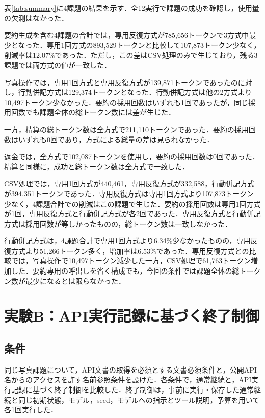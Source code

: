 \documentclass[letter]{ieicej}
\begin{document}
表\ref{tab:summary}に4課題の結果を示す．全12実行で課題の成功を確認し，使用量の欠測はなかった．

\SummaryResultsTable

要約生成を含む4課題の合計では，専用反復方式が785,656トークンで3方式中最少となった．専用1回方式の893,529トークンと比較して107,873トークン少なく，削減率は12.07\%であった．ただし，この差はCSV処理のみで生じており，残る3課題では両方式の値が一致した．

写真操作では，専用1回方式と専用反復方式が139,871トークンであったのに対し，行動併記方式は129,374トークンとなった．行動併記方式は他の2方式より10,497トークン少なかった．要約の採用回数はいずれも1回であったが，同じ採用回数でも課題全体の総トークン数には差が生じた．

一方，精算の総トークン数は全方式で211,110トークンであった．要約の採用回数はいずれも0回であり，方式による総量の差は見られなかった．

返金では，全方式で102,087トークンを使用し，要約の採用回数は0回であった．精算と同様に，成功と総トークン数は全方式で一致した．

CSV処理では，専用1回方式が440,461，専用反復方式が332,588，行動併記方式が394,351トークンであった．専用反復方式は専用1回方式より107,873トークン少なく，4課題合計での削減はこの課題で生じた．要約の採用回数は専用1回方式が1回，専用反復方式と行動併記方式が各2回であった．専用反復方式と行動併記方式は採用回数が等しかったものの，総トークン数は一致しなかった．

行動併記方式は，4課題合計で専用1回方式より6.34\%少なかったものの，専用反復方式より51,266トークン多く，増加率は6.53\%であった．専用反復方式との比較では，写真操作で10,497トークン減少した一方，CSV処理で61,763トークン増加した．要約専用の呼出しを省く構成でも，今回の条件では課題全体の総トークン数が最少になるとは限らなかった．

\section{実験B：API実行記録に基づく終了制御}

\subsection{条件}

同じ写真課題について，API文書の取得を必須とする文書必須条件と，公開API名からのアクセスを許す名前参照条件を設けた．各条件で，通常継続と，API実行記録に基づく終了制御を比較した．終了制御は，事前に実行・保存した通常継続と同じ初期状態，モデル，seed，モデルへの指示とツール説明，予算を用いて各1回実行した．
\end{document}
